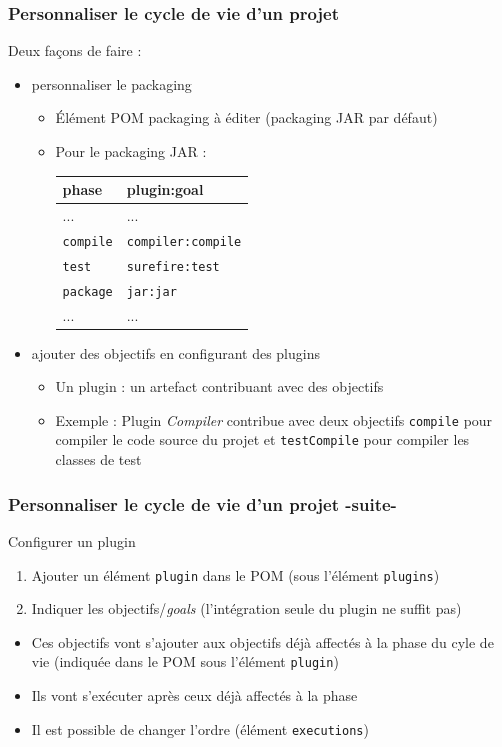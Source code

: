 \documentclass{beamer}
\begin{document}
\begin{frame}[fragile]
  \frametitle{Personnaliser le cycle de vie d'un projet}
Deux façons de faire :   
  \begin{itemize}    
  \item personnaliser le packaging
    \begin{itemize}    
    \item Élément POM packaging à éditer (packaging JAR par défaut)
    \item Pour le packaging JAR :\\
      \begin{tabular}{|l|l|}        
        \hline
        \textbf{phase} & \textbf{plugin:goal}  \\
        \hline
        ... & ...\\
        \hline
        \texttt{compile} & \texttt{compiler:compile} \\
        \hline
        \texttt{test} & \texttt{surefire:test} \\
        \hline
        \texttt{package} & \texttt{jar:jar} \\
        \hline
        ... & ...\\
        \hline
\end{tabular}

    \end{itemize}
  \item ajouter des objectifs en configurant des plugins
    \begin{itemize}    
    \item Un plugin : un artefact contribuant avec des objectifs
    \item Exemple : Plugin \textit{Compiler} contribue avec deux
      objectifs \texttt{compile} pour compiler le code source du
      projet et \texttt{testCompile} pour compiler les classes de test
    \end{itemize}
\end{itemize}
\end{frame}

\begin{frame}[fragile]
  \frametitle{Personnaliser le cycle de vie d'un projet -suite-}
  \begin{block}{Configurer un plugin}
    \begin{enumerate}
    \item Ajouter un élément \texttt{plugin} dans le POM (sous
      l'élément \texttt{plugins})
    \item Indiquer les objectifs/\textit{goals} (l'intégration seule
      du plugin ne suffit pas)
    \end{enumerate}
  \end{block}
  \begin{itemize}
  \item Ces objectifs vont s'ajouter aux objectifs déjà affectés à la
    phase du cyle de vie (indiquée dans le POM sous l'élément
    \texttt{plugin})
  \item Ils vont s'exécuter après ceux déjà affectés à la phase
  \item Il est possible de changer l'ordre (élément
    \texttt{executions})
  \end{itemize}
\end{frame}
\end{document}
